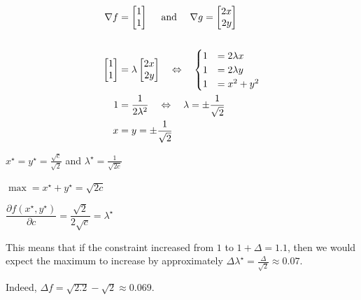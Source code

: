 \documentclass{workbook}
\begin{document}
\begin{solution}
\begin{slide}

\begin{parts}
	\item 
	\begin{align*}
		\nabla f & = \mat{1\\1}  
			\quad \text{ and } \quad \nabla g = \mat{2x\\2y} \\
		\\
		\mat{1\\1} & = \lambda \mat{2x \\ 2y} \quad \Leftrightarrow \quad 
			\begin{cases}
				1 & = 2\lambda x \\
				1 & = 2\lambda y \\
				1 & = x^2 + y^2	
			\end{cases}
			\\
		1 & = \frac{1}{2 \lambda^2} \quad \Leftrightarrow\quad 
			\lambda = \pm\frac{1}{\sqrt{2}}\\
		x & = y = \pm \frac{1}{\sqrt{2}}
	\end{align*}
	
	\item $x^\star=y^\star= \frac{\sqrt{c}}{\sqrt{2}}$ \quad and \quad $\lambda^\star = \frac{1}{\sqrt{2c}}$
		 
		 $\max = x^\star+y^\star=\sqrt{2c}$
		
	\item $\dfrac{\partial f(x^\star,y^\star)}{\partial c}
			= \dfrac{\sqrt{2}}{2\sqrt{c}} = \lambda^\star$

	\item This means that if the constraint increased from $1$ to $1 + \Delta = 1.1$, 	then we would expect the maximum to increase by approximately $\Delta \lambda^\star = \frac{\Delta}{\sqrt{2}} \approx 0.07$.
		
		Indeed, $\Delta f = \sqrt{2.2}-\sqrt{2} \approx 0.069$.

\end{parts}
	
\end{slide}	
\end{solution}
\end{document}
